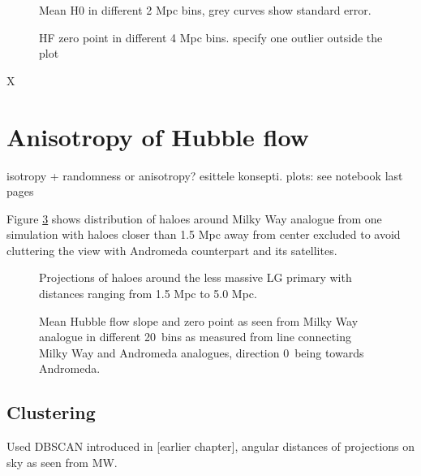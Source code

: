 \documentclass[english, oneside]{HYgradu}
\begin{document}
\begin{figure}
    \centering
    
    \caption{Mean H0 in different 2 Mpc bins, grey curves show standard error.}\label{fig:shelledH0}
\end{figure}

\begin{figure}
    \centering
    
    \caption{HF zero point in different 4 Mpc bins. specify one outlier outside the plot}\label{fig:zeros}
\end{figure}


X\section{Anisotropy of Hubble flow}
isotropy + randomness or anisotropy? esittele konsepti. plots: see notebook last pages

\reversemarginpar
{}
Figure \ref{fig:mollweide-anisotropy} shows distribution of haloes around Milky Way analogue from one simulation with haloes closer than 1.5 Mpc away from center excluded to avoid cluttering the view with Andromeda counterpart and its satellites.

\begin{figure}
    \centering
    
    \caption{Projections of haloes around the less massive LG primary with distances ranging from 1.5 Mpc to 5.0 Mpc.}\label{fig:mollweide-anisotropy}
\end{figure}

\begin{figure}
    \centering
    
    \caption{Mean Hubble flow slope and zero point as seen from Milky Way analogue in different 20\textdegree\ bins as measured from line connecting Milky Way and Andromeda analogues, direction 0\textdegree\ being towards Andromeda.}\label{fig:directionalHF}
\end{figure}

\subsection{Clustering}
Used DBSCAN introduced in [earlier chapter], angular distances of projections on sky as seen from MW.
\end{document}
